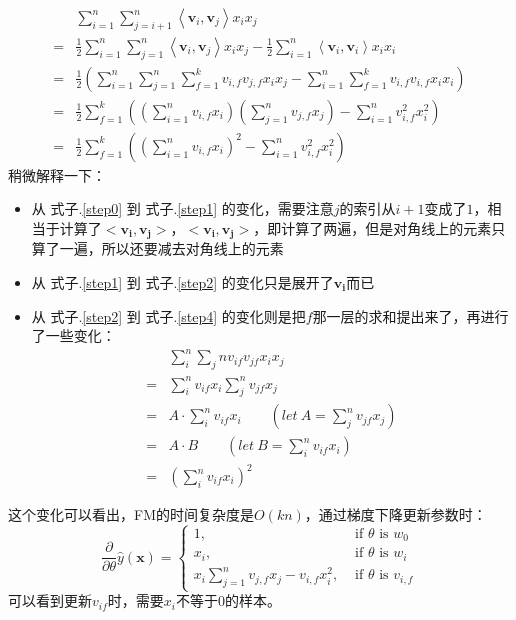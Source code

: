 \begin{align}
	& \sum_{i=1}^{n} \sum_{j=i+1}^{n}\left\langle\mathbf{v}_{i}, \mathbf{v}_{j}\right\rangle x_{i} x_{j} \label{step0} \\
	=& \frac{1}{2} \sum_{i=1}^{n} \sum_{j=1}^{n}\left\langle\mathbf{v}_{i}, \mathbf{v}_{j}\right\rangle x_{i} x_{j}-\frac{1}{2} \sum_{i=1}^{n}\left\langle\mathbf{v}_{i}, \mathbf{v}_{i}\right\rangle x_{i} x_{i} \label{step1} \\
	=& \frac{1}{2}\left(\sum_{i=1}^{n} \sum_{j=1}^{n} \sum_{f=1}^{k} v_{i, f} v_{j, f} x_{i} x_{j}-\sum_{i=1}^{n} \sum_{f=1}^{k} v_{i, f} v_{i, f} x_{i} x_{i}\right) \label{step2} \\
	=& \frac{1}{2} \sum_{f=1}^{k}\left(\left(\sum_{i=1}^{n} v_{i, f} x_{i}\right)\left(\sum_{j=1}^{n} v_{j, f} x_{j}\right)-\sum_{i=1}^{n} v_{i, f}^{2} x_{i}^{2}\right) \label{step3} \\
	=& \frac{1}{2} \sum_{f=1}^{k}\left(\left(\sum_{i=1}^{n} v_{i, f} x_{i}\right)^{2}-\sum_{i=1}^{n} v_{i, f}^{2} x_{i}^{2}\right) \label{step4}
\end{align}
稍微解释一下：
\begin{itemize}
	\item 从 式子.\ref{step0} 到 式子.\ref{step1} 的变化，需要注意$j$的索引从$i+1$变成了$1$，相当于计算了$<\boldsymbol{v_i}, \boldsymbol{v_j}>$，$<\boldsymbol{v_i}, \boldsymbol{v_j}>$，即计算了两遍，但是对角线上的元素只算了一遍，所以还要减去对角线上的元素
	\item 从 式子.\ref{step1} 到 式子.\ref{step2} 的变化只是展开了$\boldsymbol{v_i}$而已
	\item 从 式子.\ref{step2} 到 式子.\ref{step4} 的变化则是把$f$那一层的求和提出来了，再进行了一些变化：
	$$
	\begin{aligned}
		& \sum_i^{n} \sum_j{n} v_{if} v_{jf} x_i x_j \\
		=& \sum_i^n v_{if} x_i \sum_j^n v_{jf} x_j \\
		=& A \cdot \sum_i^n v_{if} x_i \qquad (let\: A = \sum_j^n v_{jf} x_j) \\
		=& A \cdot B \qquad (let \:B = \sum_i^n v_{if} x_i) \\
		=& (\sum_i^n v_{if} x_i)^2
	\end{aligned}
	$$
\end{itemize}
这个变化可以看出，FM的时间复杂度是$O(kn)$，通过梯度下降更新参数时：
\begin{equation}\nonumber
	\frac{\partial}{\partial \theta} \hat{y}(\mathbf{x})= \begin{cases}1, & \text { if } \theta \text { is } w_{0} \\ x_{i}, & \text { if } \theta \text { is } w_{i} \\ x_{i} \sum_{j=1}^{n} v_{j, f} x_{j}-v_{i, f} x_{i}^{2}, & \text { if } \theta \text { is } v_{i, f}\end{cases}
\end{equation}
可以看到更新$v_{if}$时，需要$x_i$不等于0的样本。

